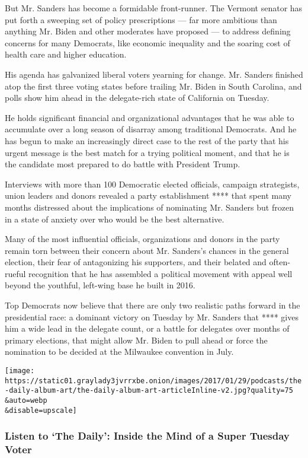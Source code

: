 But Mr. Sanders has become a formidable front-runner. The Vermont
senator has put forth a sweeping set of policy prescriptions --- far
more ambitious than anything Mr. Biden and other moderates have proposed
--- to address defining concerns for many Democrats, like economic
inequality and the soaring cost of health care and higher education.

His agenda has galvanized liberal voters yearning for change. Mr.
Sanders finished atop the first three voting states before trailing Mr.
Biden in South Carolina, and polls show him ahead in the delegate-rich
state of California on Tuesday.

He holds significant financial and organizational advantages that he was
able to accumulate over a long season of disarray among traditional
Democrats. And he has begun to make an increasingly direct case to the
rest of the party that his urgent message is the best match for a trying
political moment, and that he is the candidate most prepared to do
battle with President Trump.

Interviews with more than 100 Democratic elected officials, campaign
strategists, union leaders and donors revealed a party establishment
**** that spent many months distressed about the implications of
nominating Mr. Sanders but frozen in a state of anxiety over who would
be the best alternative.

Many of the most influential officials, organizations and donors in the
party remain torn between their concern about Mr. Sanders's chances in
the general election, their fear of antagonizing his supporters, and
their belated and often-rueful recognition that he has assembled a
political movement with appeal well beyond the youthful, left-wing base
he built in 2016.

Top Democrats now believe that there are only two realistic paths
forward in the presidential race: a dominant victory on Tuesday by Mr.
Sanders that **** gives him a wide lead in the delegate count, or a
battle for delegates over months of primary elections, that might allow
Mr. Biden to pull ahead or force the nomination to be decided at the
Milwaukee convention in July.

\texttt{[image: https://static01.graylady3jvrrxbe.onion/images/2017/01/29/podcasts/the-daily-album-art/the-daily-album-art-articleInline-v2.jpg?quality=75\\\&auto=webp\\\&disable=upscale]}

\hypertarget{listen-to-the-daily-inside-the-mind-of-a-super-tuesday-voter}{%
\subsubsection{Listen to `The Daily': Inside the Mind of a Super Tuesday
Voter}\label{listen-to-the-daily-inside-the-mind-of-a-super-tuesday-voter}}

